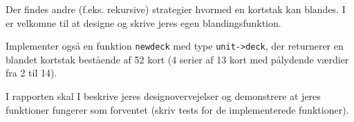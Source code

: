 Der findes andre (f.eks. rekursive) strategier hvormed en kortstak
kan blandes. I er velkomne til at designe og skrive jeres egen
blandingsfunktion.

Implementer også en funktion \lstinline{newdeck} med
type \lstinline{unit->deck}, der returnerer en blandet kortstak
bestående af 52 kort (4 serier af 13 kort med pålydende værdier fra 2
til 14).

I rapporten skal I beskrive jeres designovervejelser og demonstrere at
jeres funktioner fungerer som forventet (skriv tests for de
implementerede funktioner).
